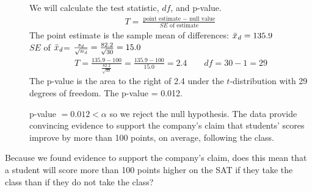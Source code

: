 \begin{examplewrap}
\begin{nexample}
\begin{description}
\item[]  We will calculate the test statistic, $df$, and p-value.
\begin{align*}
T = \frac{\text{point estimate } - \text{ null value}}{SE \text{ of estimate}}
\end{align*}
The point estimate is the sample mean of differences:  $\bar{x}_{\text{\emph{d}}}  = 135.9$\\[1mm]
$SE$ of $\bar{x}_{\text{\emph{d}}} $= $\frac{s_{\text{\emph{d}}} }{\sqrt{n_{\text{\emph{d}}} }} = \frac{82.2}{\sqrt{30}} = 15.0$ \\[1mm]
\begin{align*}
T = \frac{135.9-100}{\frac{82.2}{\sqrt{30}}} = \frac{135.9-100}{15.0}=2.4 \qquad df=30-1=29
\end{align*}
The p-value is the area to the right of 2.4 under the $t$-distribution with 29 degrees of freedom.  The p-value = 0.012.

\item[]  p-value $=0.012<\alpha$ so we reject the null hypothesis. The data provide convincing evidence to support the company's claim that students' scores improve by more than 100 points, on average, following the class.


\end{description}
\end{nexample}
\end{examplewrap}


\begin{exercisewrap}
\begin{nexercise}
Because we found evidence to support the company's claim, does this mean that a student will score more than 100 points higher on the SAT if they take the class than if they do not take the class?\footnotemark{}
\end{nexercise}
\end{exercisewrap}


\D{\newpage}





